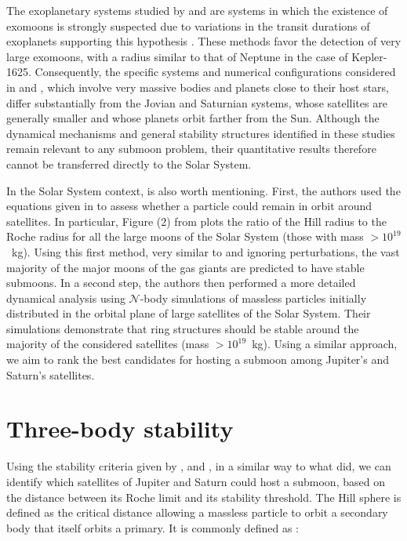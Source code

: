 \documentclass{aa}
\begin{document}
The exoplanetary systems studied by \cite{Rosario-Franco_2020} and \cite{Patel_2025} are systems in which the existence of exomoons is strongly suspected due to variations in the transit durations of exoplanets supporting this hypothesis \citep{teachy_2018}. These methods favor the detection of very large exomoons, with a radius similar to that of Neptune in the case of Kepler-1625.
Consequently, the specific systems and numerical configurations considered in \cite{Rosario-Franco_2020} and \cite{Patel_2025}, which involve very massive bodies and planets close to their host stars, differ substantially from the Jovian and Saturnian systems, whose satellites are generally smaller and whose planets orbit farther from the Sun. Although the dynamical mechanisms and general stability structures identified in these studies remain relevant to any submoon problem, their quantitative results therefore cannot be transferred directly to the Solar System.


In the Solar System context, \cite{Sucerquia2024} is also worth mentioning. First, the authors used the equations given in \cite{Domingos_2006} to assess whether a particle could remain in orbit around satellites. In particular, Figure (2) from \cite{Sucerquia2024}  plots the ratio of the Hill radius to the Roche radius for all the large moons of the Solar System (those with mass $>10^{19}$~kg).
Using this first method, very similar to \cite{Kollmeier_2019} and ignoring perturbations, the vast majority of the major moons of the gas giants are predicted to have stable submoons. In a second step, the authors then performed a more detailed dynamical analysis using \mbox{$\mathcal{N}$-body} simulations of massless particles initially distributed in the orbital plane of large satellites of the Solar System. Their simulations demonstrate that ring structures should be stable around the majority of the considered satellites (mass $>10^{19}$~kg). Using a similar approach, we aim to rank the best candidates for hosting a submoon among Jupiter's and Saturn's satellites.


\section{Three-body stability}\label{paragraph:3bodystability}


Using the stability criteria given by \cite{Domingos_2006}, \cite{Rosario-Franco_2020} and \cite{Quarles_2021}, in a similar way to what \cite{Sucerquia2024} did, we can identify which satellites of Jupiter and Saturn could host a submoon, based on the distance between its Roche limit and its stability threshold.
The Hill sphere is defined as the critical distance allowing a massless particle to orbit a secondary body that itself orbits a primary. It is commonly defined as \citep{HamiltonBurns1992,Murray_Dermott_2000}:
\end{document}
